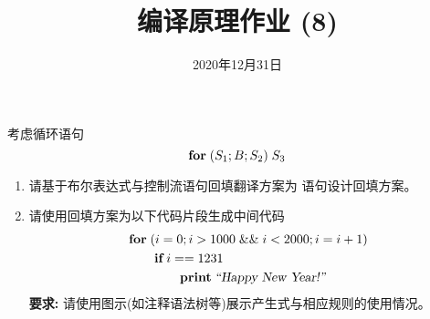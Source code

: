 \documentclass[a4paper, justified]{tufte-handout}
\title{编译原理作业 (8)}
\date{2020年12月31日}
\begin{document}
\maketitle
\noplagiarism %
\begin{abstract}
\end{abstract}
\beginrequired

\begin{problem}[\score{10 = 5 + 5}]
  考虑循环语句
  \[
    \text{\bf for} \;(S_{1}; B; S_{2})\; S_{3}
  \]
  \begin{enumerate}[(1)]
    \item 请基于布尔表达式与控制流语句回填翻译方案为 \forkw{} 语句设计回填方案。
    \item 请使用回填方案为以下代码片段生成中间代码
      \begin{align*}
        &\text{\bf for}\; (i = 0; i > 1000 \;\&\&\; i < 2000; i = i + 1) \\
          &\qquad \text{\bf if}\; i == 1231\; \\
          &\qquad\qquad \text{\bf print}\; {\textsl{``Happy New Year!''}}
      \end{align*}
      {\bf 要求:} 请使用图示(如注释语法树等)展示产生式与相应规则的使用情况。
  \end{enumerate}
\end{problem}
\end{document}
